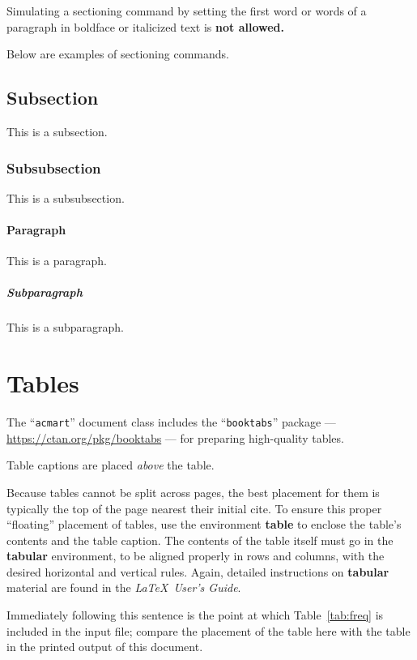 Simulating a sectioning command by setting the first word or words of
a paragraph in boldface or italicized text is {\bfseries not allowed.}

Below are examples of sectioning commands.

\subsection{Subsection}
\label{sec:subsection}

This is a subsection.

\subsubsection{Subsubsection}
\label{sec:subsubsection}

This is a subsubsection.

\paragraph{Paragraph}

This is a paragraph.

\subparagraph{Subparagraph}

This is a subparagraph.

\section{Tables}

The ``\verb|acmart|'' document class includes the ``\verb|booktabs|''
package --- \url{https://ctan.org/pkg/booktabs} --- for preparing
high-quality tables.

Table captions are placed {\itshape above} the table.

Because tables cannot be split across pages, the best placement for
them is typically the top of the page nearest their initial cite.  To
ensure this proper ``floating'' placement of tables, use the
environment \textbf{table} to enclose the table's contents and the
table caption.  The contents of the table itself must go in the
\textbf{tabular} environment, to be aligned properly in rows and
columns, with the desired horizontal and vertical rules.  Again,
detailed instructions on \textbf{tabular} material are found in the
\textit{\LaTeX\ User's Guide}.

Immediately following this sentence is the point at which
Table~\ref{tab:freq} is included in the input file; compare the
placement of the table here with the table in the printed output of
this document.

